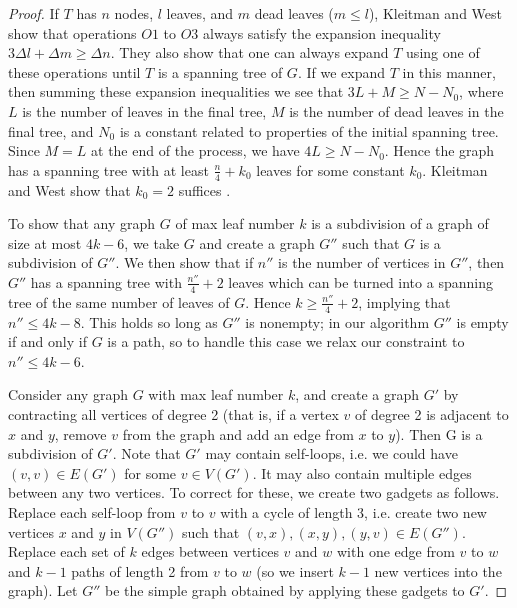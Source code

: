 \documentclass[11pt]{report}
\begin{document}
\begin{proof}
If $T$ has $n$ nodes, $l$ leaves, and $m$ dead leaves ($m\leq l$), Kleitman and West show that operations $O1$ to $O3$ always satisfy the expansion inequality $3\Delta l + \Delta m \geq \Delta n $. They also show that one can always expand $T$ using one of these operations until $T$ is a spanning tree of $G$. If we expand $T$ in this manner, then summing these expansion inequalities we see that $3L + M \geq N-N_0$, where $L$ is the number of leaves in the final tree, $M$ is the number of dead leaves in the final tree, and $N_0$ is a constant related to properties of the initial spanning tree. Since $M=L$ at the end of the process, we have $4L\geq N-N_0$. Hence the graph has a spanning tree with at least $\frac{n}{4}+k_0$ leaves for some constant $k_0$. Kleitman and West show that $k_0=2$ suffices \cite{KleitmanWest91}.




To show that any graph $G$ of max leaf number $k$ is a subdivision of a graph of size at most $4k-6$, we take $G$ and create a graph $G''$ such that $G$ is a subdivision of $G''$. We then show that if $n''$ is the number of vertices in $G''$, then $G''$ has a spanning tree with $\frac{n''}{4} +2$ leaves which can be turned into a spanning tree of the same number of leaves of $G$. Hence $k\geq \frac{n''}{4} +2$, implying that $n'' \leq 4k-8$.  This holds so long as $G''$ is nonempty; in our algorithm $G''$ is empty if and only if $G$ is a path, so to handle this case we relax our constraint to $n'' \leq 4k-6$.




Consider any graph $G$ with max leaf number $k$, and create a graph $G'$ by contracting all vertices of degree 2 (that is, if a vertex $v$ of degree 2 is adjacent to $x$ and $y$, remove $v$ from the graph and add an edge from $x$ to $y$). Then G is a subdivision of $G'$. Note that $G'$ may contain self-loops, i.e. we could have $(v,v)\in E(G')$ for some $v\in V(G')$. It may also contain multiple edges between any two vertices. To correct for these, we create two gadgets as follows. Replace each self-loop from $v$ to $v$ with a cycle of length 3, i.e. create two new vertices $x$ and $y$ in $V(G'')$ such that $(v,x),(x,y),(y,v)\in E(G'')$. Replace each set of $k$ edges between vertices $v$ and $w$ with one edge from $v$ to $w$ and $k-1$ paths of length 2 from $v$ to $w$ (so we insert $k-1$ new vertices into the graph). Let $G''$ be the simple graph obtained by applying these gadgets to $G'$.




\end{proof}
\end{document}
